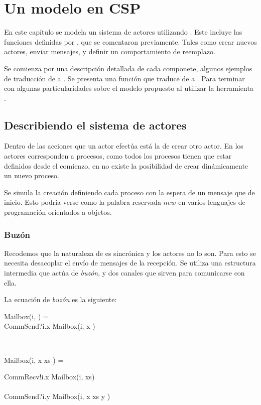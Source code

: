 \chapter{Un modelo en CSP}
En este capítulo se modela un sistema de actores utilizando \CSP. Este incluye las funciones definidas por \SAL, que se comentaron previamente. Tales como crear nuevos actores, enviar mensajes, y definir un comportamiento de reemplazo. 

Se comienza por una descripción detallada de cada componete, algunos ejemplos de traducción de \SAL a \CSP. Se presenta una función que traduce de \SAL a \CSP. Para terminar con algunas particularidades sobre el modelo propuesto al utilizar la herramienta \FDR.

\section{Describiendo el sistema de actores} 
Dentro de las acciones que un actor efectúa está la de crear otro actor. En \CSP los actores corresponden a procesos, como todos los procesos tienen que estar definidos desde el comienzo, en \CSP no existe la posibilidad de crear dinámicamente un nuevo proceso.

Se simula la creación definiendo cada proceso con la espera de un mensaje que de inicio. Esto podría verse como la palabra reservada $new$ en varios lenguajes de programación orientados a objetos. 

\subsection{Buzón}\label{modelo:buzon}

Recodemos que la naturaleza de \CSP es sincrónica y los actores no lo son. Para esto se necesita desacoplar el envío de mensajes de la recepción. Se utiliza una estructura intermedia que actúa de \textit{buzón}, y dos canales que sirven para comunicarse con ella.

La ecuación de \textit{buzón} es la siguiente:

\begin{process}
\begin{block}
Mailbox(i, \nil) = {} \\ \quad
CommSend?i.x \then Mailbox(i, \lseq x \rseq) 
\end{block} \\

\begin{block}
Mailbox(i, \lseq x \rseq \cat xs ) = {} \\ \quad 
  \begin{block}
    CommRecv!i.x \then Mailbox(i, xs) \\
    \Extchoice \\
    CommSend?i.y \then Mailbox(i, \lseq x \rseq \cat xs \cat \lseq y \rseq ) 
  \end{block}
\end{block} \\

\end{process}

